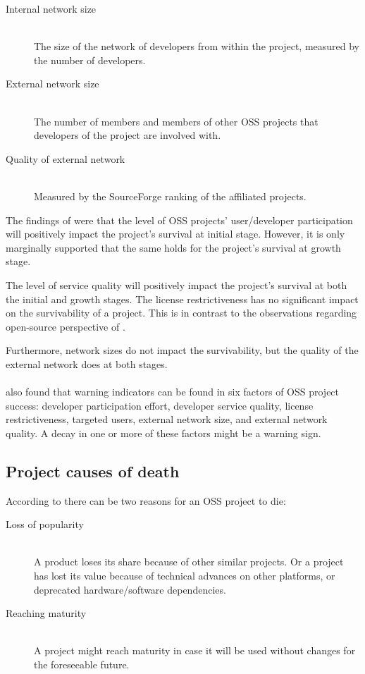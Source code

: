 \begin{description}
	\item[Internal network size] \hfill \\ The size of the network of developers
		from within the project, measured by the number of developers.

	\item[External network size] \hfill \\ The number of members and members of
		other OSS projects that developers of the project are involved with.

	\item[Quality of external network] \hfill \\ Measured by the SourceForge
		ranking of the affiliated projects.
\end{description}

\noindent
The findings of \citet{wang2012} were that the level of OSS projects'
user/developer participation will positively impact the project's survival at
initial stage. However, it is only marginally supported that the same holds for
the project's survival at growth stage.

The level of service quality will positively impact the project's survival at
both the initial and growth stages. The license restrictiveness has no
significant impact on the survivability of a project. This is in contrast to
the observations regarding open-source perspective of \citet{androutsellis}.

Furthermore, network sizes do not impact the survivability, but the quality of
the external network does at both stages.

\paragraph{}
\citet{wang2012} also found that warning indicators can be found in six factors
of OSS project success: developer participation effort, developer service
quality, license restrictiveness, targeted users, external network size, and
external network quality. A decay in one or more of these factors might be a
warning sign.

\subsection{Project causes of death}
According to \citet{karus20132} there can be two reasons for an OSS project to
die:

\begin{description}
	\item[Loss of popularity] \hfill \\ A product loses its share because of
		other similar projects. Or a project has lost its value because of technical
		advances on other platforms, or deprecated hardware/software dependencies.
		
	\item[Reaching maturity] \hfill \\ A project might reach maturity in case it
		will be used without changes for the foreseeable future.
\end{description}

